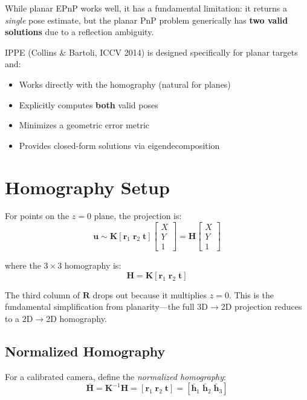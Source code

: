 \documentclass[11pt]{article}
\newcommand{\vect}[1]{\mathbf{#1}}
\newcommand{\mat}[1]{\mathbf{#1}}
\begin{document}
While planar EPnP works well, it has a fundamental limitation: it returns a \emph{single} pose estimate, but the planar PnP problem generically has \textbf{two valid solutions} due to a reflection ambiguity.

IPPE (Collins \& Bartoli, ICCV 2014) is designed specifically for planar targets and:
\begin{itemize}
    \item Works directly with the homography (natural for planes)
    \item Explicitly computes \textbf{both} valid poses
    \item Minimizes a geometric error metric
    \item Provides closed-form solutions via eigendecomposition
\end{itemize}

\section{Homography Setup}

For points on the $z=0$ plane, the projection is:
\[
\vect{u} \sim \mat{K}[\vect{r}_1 \; \vect{r}_2 \; \vect{t}]
\begin{bmatrix} X \\ Y \\ 1 \end{bmatrix}
= \mat{H}
\begin{bmatrix} X \\ Y \\ 1 \end{bmatrix}
\]

where the $3 \times 3$ homography is:
\[
\mat{H} = \mat{K}[\vect{r}_1 \; \vect{r}_2 \; \vect{t}]
\]

\begin{planarbox}
The third column of $\mat{R}$ drops out because it multiplies $z = 0$. This is the fundamental simplification from planarity---the full 3D$\to$2D projection reduces to a 2D$\to$2D homography.
\end{planarbox}

\subsection{Normalized Homography}

For a calibrated camera, define the \emph{normalized homography}:
\[
\bar{\mat{H}} = \mat{K}^{-1}\mat{H} = [\vect{r}_1 \; \vect{r}_2 \; \vect{t}] = [\bar{\vect{h}}_1 \; \bar{\vect{h}}_2 \; \bar{\vect{h}}_3]
\]
\end{document}
